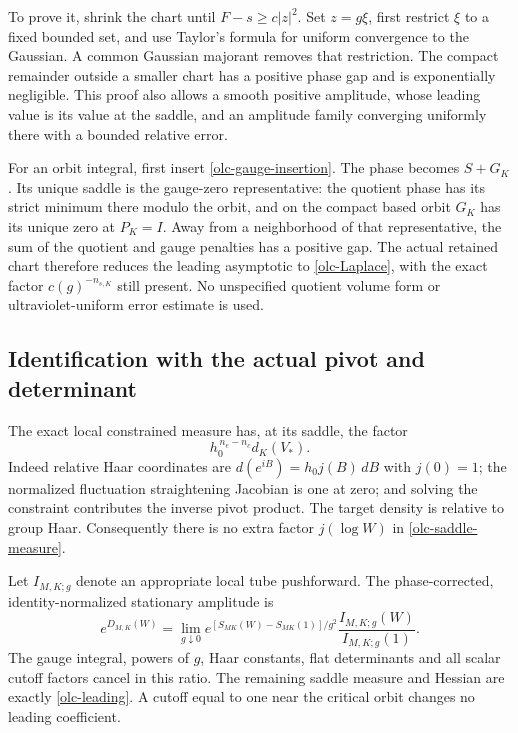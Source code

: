 To prove it, shrink the chart until $F-s\geq c|z|^2$.
Set $z=g\xi$, first restrict $\xi$ to a fixed bounded set,
and use Taylor's formula for uniform convergence to the
Gaussian. A common Gaussian majorant removes that restriction.
The compact remainder outside a smaller chart has a positive
phase gap and is exponentially negligible. This proof also
allows a smooth positive amplitude, whose leading value is
its value at the saddle, and an amplitude family converging
uniformly there with a bounded relative error.

For an orbit integral, first insert
\eqref{olc-gauge-insertion}. The phase becomes $S+G_K$.
Its unique saddle is the gauge-zero representative: the
quotient phase has its strict minimum there modulo the orbit,
and on the compact based orbit $G_K$ has its unique zero
at $P_K=I$. Away from a neighborhood of that representative,
the sum of the quotient and gauge penalties has a positive
gap. The actual retained chart therefore reduces the leading
asymptotic to \eqref{olc-Laplace}, with the exact factor
$c(g)^{-n_{s,K}}$ still present. No unspecified quotient
volume form or ultraviolet-uniform error estimate is used.

\subsection{Identification with the actual pivot and determinant}
\label{olc-identification-section}

The exact local constrained measure has, at its saddle,
the factor
\begin{equation}
                       h_0^{\,n_e-n_c}d_K(V_*).
 \label{olc-saddle-measure}
\end{equation}
Indeed relative Haar coordinates are
$d(e^{iB})=h_0j(B)\,dB$ with $j(0)=1$; the normalized
fluctuation straightening Jacobian is one at zero; and
solving the constraint contributes the inverse pivot product.
The target density is relative to group Haar. Consequently
there is no extra factor $j(\log W)$ in
\eqref{olc-saddle-measure}.

Let $I_{M,K;g}$ denote an appropriate local tube pushforward.
The phase-corrected, identity-normalized stationary amplitude is
\begin{equation}
 e^{D_{M,K}(W)}
   =\lim_{g\downarrow0}
       e^{[S_{MK}(W)-S_{MK}(1)]/g^2}
          \frac{I_{M,K;g}(W)}{I_{M,K;g}(1)} .
 \label{olc-normalized-amplitude}
\end{equation}
The gauge integral, powers of $g$, Haar constants, flat
determinants and all scalar cutoff factors cancel in this
ratio. The remaining saddle measure and Hessian are exactly
\eqref{olc-leading}. A cutoff equal to one near the critical
orbit changes no leading coefficient.

